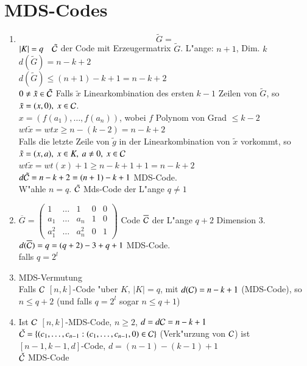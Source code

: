 \section{MDS-Codes}
\begin{enumerate}[(1)]
	\item
	\[
		\tilde{G}=%
	\]
	$\left| K \right| = q\quad  \tilde{\mathcal{C}}$ der Code mit Erzeugermatrix $\tilde{G}$. L"ange: $n+1$, Dim. $k$\\
	$d(\tilde{G})=n-k+2$\\
	$d(\tilde{G})\leq (n+1)-k+1 = n-k+2$\\ %
	$0 \neq \tilde{x} \in \tilde{\mathcal{C}}$ Falls $ \tilde{x}$ Linearkombination des ersten $k-1$ Zeilen von $ \tilde{G}$, so $ \tilde{x}=(x,0),\ x\in\mathcal{C}$.\\
	$x=(f(a_1),\ldots,f(a_n))$, wobei $f$ Polynom von Grad $\leq k-2$\\
	$wt \tilde{x} = wt x \geq n-(k-2)=n-k+2$\\
	Falls die letzte Zeile von $ \tilde{g}$ in der Linearkombination von $ \tilde{x}$ vorkommt, so $ \tilde{x}=(x,a),\ x\in K,\ a \neq 0,\ x \in \mathcal{C}$\\
	$wt \tilde{x} = wt (x) + 1 \geq n-k+1+1=n-k+2$\\
	$d \tilde{\mathcal{C}} = n-k+2 = (n+1)-k+1$ MDS-Code. \\
	W"ahle $n=q$. $ \tilde{\mathcal{C}}$ Mds-Code der L"ange $q \neq 1$
	\item
	$\overline{G} =
	\begin{pmatrix}
		1 & \ldots & 1 & 0 & 0 \\ 
		a_1 & \ldots & a_n & 1 & 0 \\ 
		a_1^2 & \ldots & a_n^2 & 0 & 1
	\end{pmatrix}$
	Code $ \overline{\mathcal{C}}$ der L"ange $q+2$ Dimension 3.\\
	$d(\overline{\mathcal{C}})=q=(q+2)-3+q+1$ MDS-Code.\\
	falls $q=2^l$
	\item
	MDS-Vermutung\\
	Falls $\mathcal{C}$ $[n,k]$-Code "uber $K$, $\left| K \right| =q$, mit $d(\mathcal{C})=n-k+1$ (MDS-Code), so $n \leq q+2$ (und falls $q=2^l$ sogar $n\leq q+1$) 
	\item
	Ist $\mathcal{C}$ $[n,k]$-MDS-Code, $n \geq 2$, $d = d \mathcal{C} = n-k+1$\\
	$ \check{\mathcal{C}}=\lbrace (c_1,\ldots,c_{n-1}: (c_1,\ldots,c_{n-1},0) \in \mathcal{C} \rbrace$ (Verk"urzung von $\mathcal{C}$) ist $[n-1,k-1,d]$-Code, $d=(n-1)-(k-1)+1$\\
	$ \check{\mathcal{C}}$ MDS-Code
\end{enumerate}